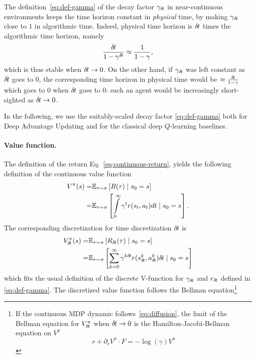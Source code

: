The definition~\eqref{eq:def-gamma} of the decay factor $\gamma_{\delta\hspace{-.1em}t}$ in
near-continuous environments keeps the time horizon constant in
\emph{physical} time, by making $\gamma_{\delta\hspace{-.1em}t}$ close to $1$ in
algorithmic time. Indeed, physical time horizon is ${\delta\hspace{-.1em}t}$ times the
algorithmic time horizon, namely
\begin{equation}
          \label{eq:time-horizon}
          \frac{{\delta\hspace{-.1em}t}}{1-\gamma^{\delta\hspace{-.1em}t}}
          \approx \frac{1}{1-\gamma},
        \end{equation}
which is thus stable when ${\delta\hspace{-.1em}t}\to 0$.
On the other hand,
if $\gamma_{\delta\hspace{-.1em}t}$ was left constant
as ${\delta\hspace{-.1em}t}$ goes to $0$, the corresponding time horizon in physical time
would be $\approx \frac{{\delta\hspace{-.1em}t}}{1 - \gamma}$ which goes to $0$ when
${\delta\hspace{-.1em}t}$ goes to $0$: such an agent would be increasingly short-sighted
as ${\delta\hspace{-.1em}t}\to 0$.

In the following, we use the suitably-scaled decay factor
\eqref{eq:def-gamma} both for Deep Advantage Updating and for the
classical deep $Q$-learning baselines.
%       
        


\paragraph{Value function.}


The definition of the return Eq.~\eqref{eq:continuous-return}, yields the
following definition of the continuous value function
\begin{align}
  V^\pi(s) =& \mathbb{E}_{\tau\sim\pi}\left[R(\tau) \mid s_0 = s\right]\\
  =& \mathbb{E}_{\tau\sim\pi}\left[\int\limits_{0}^\infty \gamma^{t} r(s_t, a_t) dt \mid s_0 = s\right].
\end{align}
The corresponding discretization for time discretization ${\delta\hspace{-.1em}t}$ is
\begin{align}
  V^\pi_{\delta\hspace{-.1em}t}(s) =& \mathbb{E}_{\tau\sim\pi}\left[R_{\delta\hspace{-.1em}t}(\tau) \mid s_0 = s\right]\\
  =& \mathbb{E}_{\tau\sim\pi}\left[\sum\limits_{k=0}^\infty \gamma^{k{\delta\hspace{-.1em}t}}r(s^k_{{\delta\hspace{-.1em}t}}, a^k_{{\delta\hspace{-.1em}t}}){\delta\hspace{-.1em}t} \mid s_0 = s\right]
\end{align}
which fits the usual definition of the discrete V-function for $\gamma_{\delta\hspace{-.1em}t}$ and
$r_{\delta\hspace{-.1em}t}$ defined in \eqref{eq:def-gamma}.
The discretized value function follows the Bellman equation\footnote{
If the continuous MDP dynamic follows~\eqref{eq:diffusion}, the limit of the Bellman equation for $V^\pi_{\delta\hspace{-.1em}t}$ when ${\delta\hspace{-.1em}t} \rightarrow 0$ is the Hamilton-Jacobi-Bellman equation on $V^\pi$ \cite{cont_rl}
\begin{equation}
  \label{eq:hamilton-jacobi-bellman}
  r + \partial_s V^\pi \cdot F = - \log(\gamma) V^\pi
\end{equation}}

